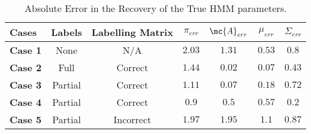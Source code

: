 \begin{table}[!htb]
   \centering 
   \caption{Absolute Error in the Recovery of the True HMM parameters.}
   \label{table:hmm_cases}
   \begin{tabular}{l c c c c c c  }
     \toprule 
     Cases&      Labels&      Labelling Matrix&      $\pi_{err}$&      $\mc{A}_{err}$&      $\mu_{err}$& $\Sigma_{err}$\\ 
     \midrule 
     \textbf{Case 1} &None &N/A &$2.03$  &$1.31$  &$0.53$  &$0.8$  \\ 
     \textbf{Case 2} &Full &Correct &$1.44$  &$0.02$  &$0.07$  &$0.43$  \\ 
     \textbf{Case 3} &Partial &Correct &$1.11$  &$0.07$  &$0.18$  &$0.72$  \\ 
     \textbf{Case 4} &Partial &Correct &$0.9$  &$0.5$  &$0.57$  &$0.2$  \\ 
     \textbf{Case 5} &Partial &Incorrect &$1.97$  &$1.95$  &$1.1$  &$0.87$  \\ 
     \bottomrule 
 
   \end{tabular} 
\end{table}